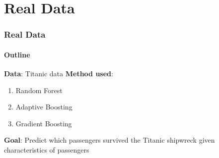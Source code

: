\section{Real Data}

\begin{frame}[fragile] %
    \frametitle{Real Data}
    \framesubtitle{Outline}
    \textbf{Data}: Titanic data
\vspace{1ex}
    \newline \textbf{Method used}: 
\vspace{1ex}
    \begin{enumerate}
        \item Random Forest
        \item Adaptive Boosting 
        \item Gradient Boosting
    \end{enumerate}
\vspace{1ex}
    \textbf{Goal}: Predict which passengers survived the Titanic shipwreck given characteristics of passengers
\end{frame}
    


